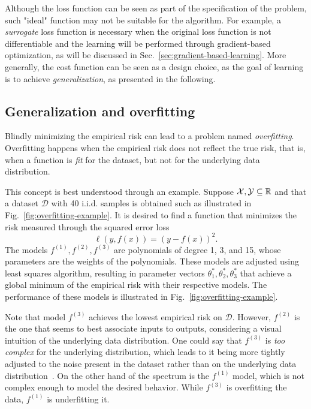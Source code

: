 Although the loss function can be seen as part of the specification of the problem, such "ideal" function may not be suitable for the algorithm.
For example, a \emph{surrogate} loss function is necessary when the original loss function is not differentiable and the learning will be performed through gradient-based optimization, as will be discussed in Sec.~\ref{sec:gradient-based-learning}.
More generally, the cost function can be seen as a design choice, as the goal of learning is to achieve \emph{generalization}, as presented in the following.


\subsection{Generalization and overfitting}\label{sec:generalization-overfitting}

Blindly minimizing the empirical risk can lead to a problem named \emph{overfitting}.
Overfitting happens when the empirical risk does not reflect the true risk, that is, when a function is \emph{fit} for the dataset, but not for the underlying data distribution.

This concept is best understood through an example.
Suppose $\mathcal{X},\mathcal{Y}\subseteq\mathbb{R}$ and that a dataset $\mathcal{D}$ with 40 i.i.d. samples is obtained such as illustrated in Fig.~\ref{fig:overfitting-example}.
It is desired to find a function that minimizes the risk measured through the squared error loss \[
    \ell(y,f(x)) = (y-f(x))^2
.\] 
The models $f^{(1)},f^{(2)},f^{(3)}$ are polynomials of degree 1, 3, and 15, whose parameters are the weights of the polynomials.
These models are adjusted using least squares algorithm, resulting in parameter vectors $\theta_1^*,\theta_2^*,\theta_3^*$ that achieve a global minimum of the empirical risk with their respective models.
The performance of these models is illustrated in Fig.~\ref{fig:overfitting-example}.

Note that model $f^{(3)}$ achieves the lowest empirical risk on $\mathcal{D}$.
However, $f^{(2)}$ is the one that seems to best associate inputs to outputs, considering a visual intuition of the underlying data distribution.
One could say that $f^{(3)}$ is \emph{too complex} for the underlying distribution, which leads to it being more tightly adjusted to the noise present in the dataset rather than on the underlying data distribution~\cite{murphyMachineLearningProbabilistic2013}.
On the other hand of the spectrum is the $f^{(1)}$ model, which is not complex enough to model the desired behavior.
While $f^{(3)}$ is overfitting the data, $f^{(1)}$ is underfitting it.

